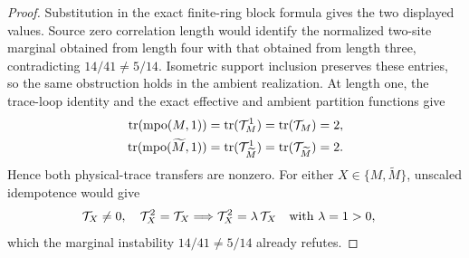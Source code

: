 \begin{proof}
    \leanok
    Substitution in the exact finite-ring block formula gives the two displayed
    values.  Source zero correlation length would identify the normalized
    two-site marginal obtained from length four with that obtained from length
    three, contradicting $14/41\ne5/14$.  Isometric support inclusion preserves
    these entries, so the same obstruction holds in the ambient realization.
    At length one, the trace-loop identity and the exact effective and
    ambient partition functions give
    \begin{align}
        \operatorname{tr}(\operatorname{mpo}(M,1))
         & =\operatorname{tr}(\mathcal T_M^1)
        =\operatorname{tr}(\mathcal T_M)=2,
        \notag                                             \\
        \operatorname{tr}(\operatorname{mpo}(\widetilde M,1))
         & =\operatorname{tr}(\mathcal T_{\widetilde M}^1)
        =\operatorname{tr}(\mathcal T_{\widetilde M})=2.
        \notag
    \end{align}
    Hence both physical-trace transfers are nonzero.  For either
    $X\in\{M,\widetilde M\}$, unscaled idempotence would give
    \begin{align}
        \mathcal T_X\ne0,\quad \mathcal T_X^2=\mathcal T_X
         & \Longrightarrow
        \mathcal T_X^2=\lambda\,\mathcal T_X
        \quad\text{with }\lambda=1>0,
        \notag
    \end{align}
    which the marginal instability $14/41\ne5/14$ already refutes.
\end{proof}

